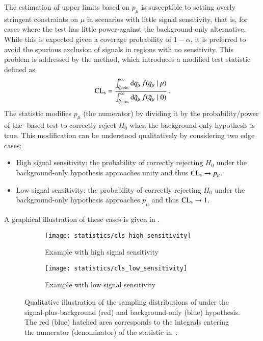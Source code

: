 The estimation of upper limits based on $p_\mu$ is susceptible to setting overly
stringent constraints on $\mu$ in scenarios with little signal sensitivity, that
is, for cases where the test has little power against the background-only
alternative.
While this is expected given a coverage
probability of $1 - \alpha$, it is preferred to avoid the spurious exclusion of
signals in regions with no sensitivity. This problem is addressed by the \CLs
method, which introduces a modified test statistic defined
as~\cite{Cowan:2010js}
\begin{align}
  \text{CL}_{\text{s}} = \frac
  {\int_{\tilde{q}_{\mu, \text{obs}}}^{\infty} \mathrm{d}\tilde{q}_{\mu} \, f(\tilde{q}_{\mu} \mid \mu)}
  {\int_{\tilde{q}_{\mu, \text{obs}}}^\infty \mathrm{d}\tilde{q}_{\mu} \, f(\tilde{q}_{\mu} \mid 0)} \,\text{.}
  \label{eq:cls}
\end{align}
The \CLs statistic modifies $p_\mu$ (the numerator) by dividing it by the
probability/power of the \qmutilde-based test to correctly reject $H_0$ when the
background-only hypothesis is true. This modification can be understood
qualitatively by considering two edge cases:
\begin{itemize}

\item High signal sensitivity: the probability of correctly rejecting $H_0$
  under the background-only hypothesis approaches unity and thus
  $\text{CL}_{\text{s}} \rightarrow p_\mu$.

\item Low signal sensitivity: the probability of correctly rejecting $H_0$ under
  the background-only hypothesis approaches $p_\mu$ and thus $\text{CL}_{\text{s}} \rightarrow 1$.

\end{itemize}
A graphical illustration of these cases is given in .

\begin{figure}[htbp]
  \centering

  \begin{subfigure}{0.46\textwidth}
    \texttt{[image: statistics/cls\_high\_sensitivity]}
    \caption{Example with high signal sensitivity}
  \end{subfigure}\hfill%
  \begin{subfigure}{0.46\textwidth}
    \texttt{[image: statistics/cls\_low\_sensitivity]}
    \caption{Example with low signal sensitivity}
  \end{subfigure}

  \caption{Qualitative illustration of the sampling distributions of \qmutilde
    under the signal-plus-background (red) and background-only (blue)
    hypothesis. The red (blue) hatched area corresponds to the integrals
    entering the numerator (denominator) of the \CLs statistic
    in~.}%
  \label{fig:cls_qmutilde}
\end{figure}

